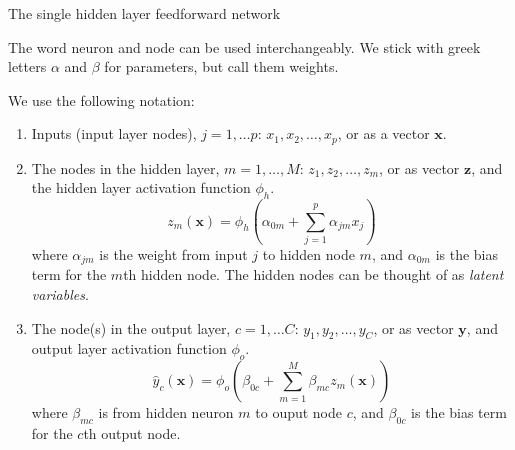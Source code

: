 \documentclass[10pt,ignorenonframetext,]{beamer}
\providecommand{\tightlist}{%
  \setlength{\itemsep}{0pt}\setlength{\parskip}{0pt}}
\begin{document}
\begin{frame}

\begin{block}{The single hidden layer feedforward network}

The word neuron and node can be used interchangeably. We stick with
greek letters \(\alpha\) and \(\beta\) for parameters, but call them
weights.

We use the following notation:

\begin{enumerate}
\tightlist
\item
  Inputs (input layer nodes), \(j=1,\dots p\):
  \(x_1, x_2, \ldots, x_p\), or as a vector \({\boldsymbol x}\).
\item
  The nodes in the hidden layer, \(m=1,\ldots, M\):
  \(z_1, z_2, \ldots, z_m\), or as vector \({\boldsymbol z}\), and the
  hidden layer activation function \(\phi_h\). \[
  z_m({\boldsymbol x})=\phi_h(\alpha_{0m}+\sum_{j=1}^p \alpha_{jm}x_{j})
  \] where \(\alpha_{jm}\) is the weight from input \(j\) to hidden node
  \(m\), and \(\alpha_{0m}\) is the bias term for the \(m\)th hidden
  node. The hidden nodes can be thought of as \emph{latent variables}.
\end{enumerate}

\end{block}

\end{frame}

\begin{frame}

\begin{enumerate}
\setcounter{enumi}{2}
\tightlist
\item
  The node(s) in the output layer, \(c=1,\ldots C\):
  \(y_1, y_2, \ldots, y_C\), or as vector \({\boldsymbol y}\), and
  output layer activation function \(\phi_o\). \[
  \hat{y}_c({\boldsymbol x})=\phi_o(\beta_{0c}+\sum_{m=1}^M \beta_{mc}z_{m}({\boldsymbol x}))
  \] where \(\beta_{mc}\) is from hidden neuron \(m\) to ouput node
  \(c\), and \(\beta_{0c}\) is the bias term for the \(c\)th output
  node.
\end{enumerate}

\end{frame}
\end{document}
